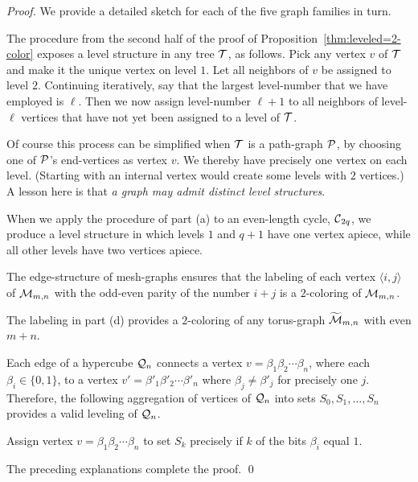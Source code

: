 \begin{proof}
We provide a detailed sketch for each of the five graph families in turn.

\smallskip

The procedure from the second half of the proof of Proposition~\ref{thm:leveled=2-color} exposes a level structure in any tree $\mbox{$\cal T$}$, as follows.  Pick any vertex $v$ of $\mbox{$\cal T$}$ and make it the
unique vertex on level $1$.  Let all neighbors of $v$ be assigned to level $2$.  Continuing iteratively, say that the largest level-number that we have employed is $\ell$.  Then we now assign level-number $\ell +1$ to all neighbors of level-$\ell$ vertices that have not yet been
assigned to a level of $\mbox{$\cal T$}$.

\smallskip

Of course this process can be simplified when $\mbox{$\cal T$}$ is a path-graph $\mbox{$\cal P$}$, by choosing one of $\mbox{$\cal P$}$'s end-vertices as vertex $v$.  We thereby have precisely one vertex on each level.  (Starting with an internal vertex would create some levels with $2$ vertices.)  A lesson here is that {\em a graph may admit distinct level structures}.

\medskip

When we apply the procedure of part (a) to an even-length cycle, $\mbox{$\cal C$}_{2q}$, we produce a level structure in which levels $1$ and $q+1$ have one vertex apiece, while all other levels have two vertices apiece.

\medskip

The edge-structure of mesh-graphs ensures that the labeling of each vertex $\langle i,j \rangle$ of $\mbox{$\cal M$}_{m,n}$ with the odd-even parity of the number $i+j$ is a $2$-coloring of $\mbox{$\cal M$}_{m,n}$.

\medskip

The labeling in part (d) provides a $2$-coloring of any torus-graph $\widetilde{\mbox{$\cal M$}}_{m,n}$ with even $m+n$.

\medskip

Each edge of a hypercube $\mbox{$\cal Q$}_n$ connects a vertex $v = \beta_1 \beta_2 \cdots \beta_n$, where each $\beta_i \in \{0,1\}$, to a vertex $v' = \beta'_1 \beta'_2 \cdots \beta'_n$ where  $\beta_j \neq \beta'_j$ for precisely one $j$.  Therefore, the following aggregation of vertices of $\mbox{$\cal Q$}_n$ into sets $S_0, S_1, \ldots, S_n$ provides a valid leveling of $\mbox{$\cal Q$}_n$.

\smallskip

Assign vertex $v = \beta_1 \beta_2 \cdots \beta_n$ to set $S_k$ precisely if $k$ of the bits $\beta_i$ equal $1$.

\medskip

\noindent
The preceding explanations complete the proof. \qed
\end{proof}

